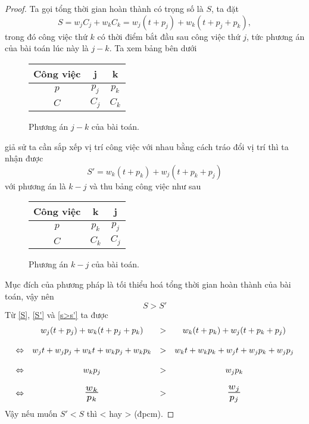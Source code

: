 \documentclass[12pt,a4paper]{report}
\begin{document}
\begin{proof}
	Ta gọi tổng thời gian hoàn thành có trọng số là $S$, ta đặt
	\begin{equation} \label{S}
		S = w_j C_j + w_k C_k = w_j(t+p_j) + w_k(t+p_j+p_k),
	\end{equation}
	trong đó công việc thứ $k$ có thời điểm bắt đầu sau công việc thứ $j$, tức phương án của bài toán lúc này là $j - k$. Ta xem bảng bên dưới
	
	\begin{figure}[h!]
		\centering
		 \begin{tabular}{|c | c c |} 
		 \hline
		 Công việc & j & k \\
		 \hline\hline
		 $p$ & $p_j$ & $p_k$ \\
		 $C$ & $C_j$ & $C_k$ \\
		 \hline
		 \end{tabular}
	\caption{Phương án $j - k$ của bài toán.}
	\end{figure}
	
	giả sử ta cần sắp xếp vị trí công việc với nhau bằng cách tráo đổi vị trí thì ta nhận được
	\begin{equation} \label{S'}
		S' = w_k(t+p_k) + w_j(t+p_k+p_j)
	\end{equation}
	với phương án là $k-j$ và thu bảng công việc như sau
	
	\begin{figure}[h!]
		\centering
		 \begin{tabular}{|c | c c |} 
		 \hline
		 Công việc & k & j \\
		 \hline\hline
		 $p$ & $p_k$ & $p_j$ \\
		 $C$ & $C_k$ & $C_j$ \\
		 \hline
		 \end{tabular}
	\caption{Phương án $k - j$ của bài toán.}
	\end{figure}

	Mục đích của phương pháp là tối thiểu hoá tổng thời gian hoàn thành của bài toán, vậy nên
	\begin{equation} \label{s>s'}
		S > S'
	\end{equation}
	Từ \eqref{S}, \eqref{S'} và \eqref{s>s'} ta được
        \begin{equation*}
        \begin{array}{c c c c}
		& w_j(t+p_j) + w_k(t+p_j+p_k) &>& w_k(t+p_k) + w_j(t+p_k+p_j) \\
		\\
		\Leftrightarrow & w_jt + w_jp_j + w_kt + w_k p_j + w_kp_k &>& w_k t + w_k p_k + w_j t + w_j p_k + w_j p_j \\
		\\
		\Leftrightarrow & w_k p_j &>& w_j p_k \\
		\\
		\Leftrightarrow & \scalebox{1.5}{$\frac{w_k}{p_k}$} &>& \scalebox{1.5}{$\frac{w_j}{p_j}$} \\
        \end{array}
        \end{equation*}
		Vậy nếu muốn $S'<S$ thì  <  hay  >  (đpcm).
\end{proof}
\end{document}
